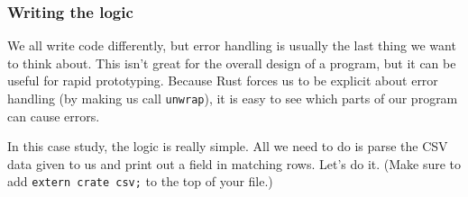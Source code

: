 \documentclass[a4paper,]{book}
\begin{document}
\hypertarget{writing-the-logic}{\subsubsection{Writing the
logic}\label{writing-the-logic}}

We all write code differently, but error handling is usually the last
thing we want to think about. This isn't great for the overall design of
a program, but it can be useful for rapid prototyping. Because Rust
forces us to be explicit about error handling (by making us call
\texttt{unwrap}), it is easy to see which parts of our program can cause
errors.

In this case study, the logic is really simple. All we need to do is
parse the CSV data given to us and print out a field in matching rows.
Let's do it. (Make sure to add \texttt{extern\ crate\ csv;} to the top
of your file.)
\end{document}
